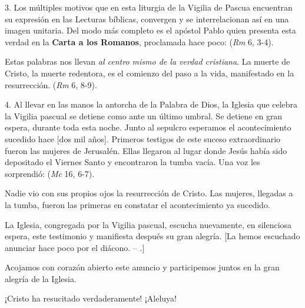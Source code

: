 \begin{body}
3. Los múltiples motivos que en esta liturgia de la Vigilia de Pascua encuentran su expresión en las Lecturas bíblicas, convergen y se interrelacionan así en una imagen unitaria. Del modo más completo es el apóstol Pablo quien presenta esta verdad en la \textbf{Carta a los Romanos}, proclamada hace poco:  (\textit{Rm} 6, 3-4).

Estas palabras nos llevan \textit{al centro mismo de la verdad cristiana}. La muerte de Cristo, la muerte redentora, es el comienzo del paso a la vida, manifestado en la resurrección.  (\textit{Rm} 6, 8-9).

4. Al llevar en las manos la antorcha de la Palabra de Dios, la Iglesia que celebra la Vigilia pascual se detiene como ante un último umbral. Se detiene en gran espera, durante toda esta noche. Junto al sepulcro esperamos el acontecimiento sucedido hace [dos mil años]. Primeros testigos de este suceso extraordinario fueron las mujeres de Jerusalén. Ellas llegaron al lugar donde Jesús había sido depositado el Viernes Santo y encontraron la tumba vacía. Una voz les sorprendió:  (\textit{Mc} 16, 6-7).

Nadie vio con sus propios ojos la resurrección de Cristo. Las mujeres, llegadas a la tumba, fueron las primeras en constatar el acontecimiento ya sucedido.

La Iglesia, congregada por la Vigilia pascual, escucha nuevamente, en silenciosa espera, este testimonio y manifiesta después su gran alegría. [La hemos escuchado anunciar hace poco por el diácono.  -- .]

Acojamos con corazón abierto este anuncio y participemos juntos en la gran alegría de la Iglesia.

¡Cristo ha resucitado verdaderamente! ¡Aleluya!
\end{body}

